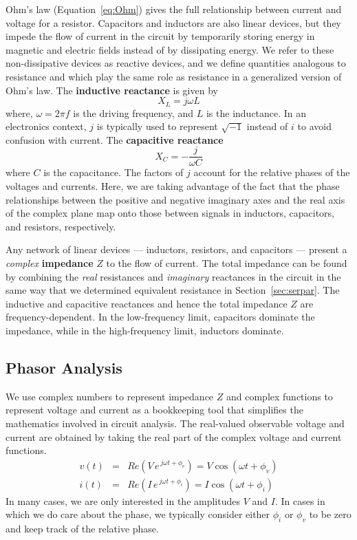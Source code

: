 \documentclass[11pt]{article}
\begin{document}
Ohm's law (Equation~\ref{eq:Ohm}) gives the full relationship between
current and voltage for a resistor. Capacitors and inductors are also
linear devices, but they impede the flow of current in the circuit
by temporarily storing energy in magnetic and electric fields instead
of by dissipating energy. We refer to these non-dissipative devices as
reactive devices, and we define quantities analogous to resistance
and which play the same role as resistance in a generalized version of
Ohm's law. The \textbf{inductive reactance} is given by
\begin{equation}
  X_L = j \omega L
  \label{eq:xl}
\end{equation}
where, $\omega = 2 \pi f$ is the driving frequency, and $L$ is the
inductance. In an electronics context,  $j$ is typically used to
represent $\sqrt{-1}$ instead of $i$ to avoid confusion with
current. The \textbf{capacitive reactance} 
\begin{equation}
  X_C = -\frac{j}{\omega C}
  \label{eq:xc}
\end{equation}
where $C$ is the capacitance. The factors of $j$ account for the
relative phases of the voltages and currents. Here, we are taking
advantage of the fact that the phase relationships between the
positive and negative imaginary axes and the real axis of the complex
plane map onto those between signals in inductors, capacitors, and
resistors, respectively.

Any network of linear devices ---  inductors, resistors, and
capacitors --- present a \emph{complex} \textbf{impedance} $Z$ to the
flow of current. The total impedance can be found by combining the
\emph{real} resistances and \emph{imaginary} reactances in the circuit
in the same way that we determined equivalent resistance in
Section~\ref{sec:serpar}. The inductive and capacitive reactances and
hence the total impedance $Z$ are frequency-dependent. In the
low-frequency limit, capacitors dominate the impedance, while in the
high-frequency limit, inductors dominate.

\subsection{Phasor Analysis}

We use complex numbers to represent impedance $Z$ and complex
functions to represent voltage and current as a bookkeeping
tool that simplifies the mathematics involved in circuit
analysis. The real-valued observable voltage and current are obtained
by  taking the real part of the complex voltage and current functions.
\begin{eqnarray}
  v(t) &=& Re(V \, e^{\,j\omega t + \phi_v}) = V \cos(\omega t + \phi_v)\\
  \nonumber
  i(t) &=& Re(I \, e^{\,j\omega t + \phi_i}) = I \cos(\omega t + \phi_i)
\end{eqnarray}
In many cases, we are only interested in the amplitudes $V$ and
$I$. In cases in which we do care about the phase, we typically
consider either $\phi_i$ or $\phi_v$ to be zero and keep track of the
relative phase.
\end{document}

